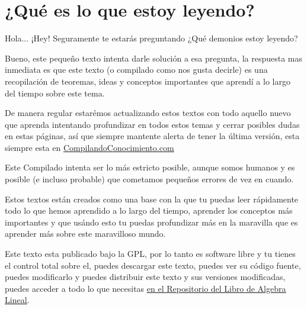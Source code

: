 \documentclass[12pt, fleqn]{report}                             %
\theoremstyle{break}                                            %
\begin{document}
\tableofcontents{}
\label{sec:Index}

\clearpage





\section{¿Qué es lo que estoy leyendo?}
    
    Hola... ¡Hey! Seguramente te estarás preguntando
    ¿Qué demonios estoy leyendo?

    Bueno, este pequeño texto intenta darle solución a esa pregunta, la respuesta mas inmediata es
    que este texto (o compilado como nos gusta decirle) es una recopilación de teoremas, ideas
    y conceptos importantes que aprendí a lo largo del tiempo sobre este tema.

    De manera regular estarémos actualizando estos textos con todo aquello nuevo que aprenda intentando
    profundizar en todos estos temas y cerrar posibles dudas en estas páginas, así que siempre mantente
    alerta de tener la última versión, esta siempre esta en \href{http://www.CompilandoConocimiento.com}
    {\underline{CompilandoConocimiento.com}} 

    Este Compilado intenta ser lo más estricto posible, aunque somos humanos y es posible (e incluso probable) que
    cometamos pequeños errores de vez en cuando.

    Estos textos están creados como una base con la que tu puedas leer rápidamente todo lo que hemos aprendido
    a lo largo del tiempo, aprender los conceptos más importantes y que usándo esto tu puedas profundizar
    más en la maravilla que es aprender más sobre este maravilloso mundo.

    Este texto esta publicado bajo la GPL, por lo tanto es software libre y tu tienes el control total sobre
    el, puedes descargar este texto, puedes ver su código fuente, puedes modificarlo y puedes distribuir este
    texto y sus versiones modificadas, puedes acceder a todo lo que necesitas 
    \href{http://www.github.com/CompilandoConocimiento/LibroAlgebraLineal}
    {\underline{en el Repositorio del Libro de Algebra Lineal}}. 
\end{document}
